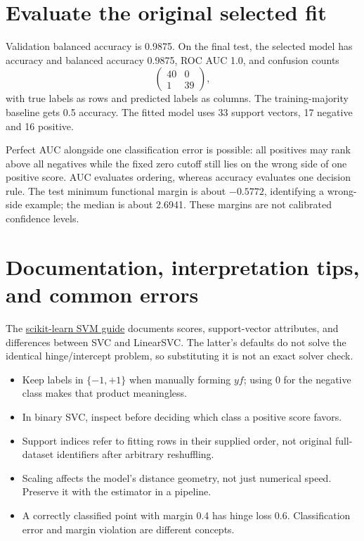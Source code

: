 \section{Evaluate the original selected fit}
Validation balanced accuracy is 0.9875. On the final test, the selected model has accuracy and balanced
accuracy 0.9875, ROC AUC 1.0, and confusion counts
\[\begin{pmatrix}40&0\\1&39\end{pmatrix},\]
with true labels as rows and predicted labels as columns. The training-majority baseline gets 0.5 accuracy.
The fitted model uses 33 support vectors, 17 negative and 16 positive.

Perfect AUC alongside one classification error is possible: all positives may rank above all negatives while
the fixed zero cutoff still lies on the wrong side of one positive score. AUC evaluates ordering, whereas
accuracy evaluates one decision rule. The test minimum functional margin is about $-0.5772$, identifying a
wrong-side example; the median is about 2.6941. These margins are not calibrated confidence levels.

\section*{Documentation, interpretation tips, and common errors}
The \href{https://scikit-learn.org/1.8/modules/svm.html}{scikit-learn SVM guide} documents scores, support-vector
attributes, and differences between SVC and LinearSVC. The latter's defaults do not solve the identical
hinge/intercept problem, so substituting it is not an exact solver check.
\begin{itemize}
\item Keep labels in $\{-1,+1\}$ when manually forming $yf$; using 0 for the negative class makes that product meaningless.
\item In binary SVC, inspect  before deciding which class a positive score favors.
\item Support indices refer to fitting rows in their supplied order, not original full-dataset identifiers after arbitrary reshuffling.
\item Scaling affects the model's distance geometry, not just numerical speed. Preserve it with the estimator in a pipeline.
\item A correctly classified point with margin 0.4 has hinge loss 0.6. Classification error and margin violation are different concepts.
\end{itemize}

